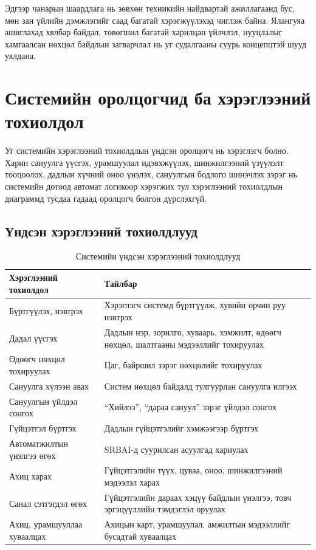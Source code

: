 Эдгээр чанарын шаардлага нь зөвхөн техникийн найдвартай ажиллагаанд бус, мөн зан үйлийн дэмжлэгийг саад багатай хэрэгжүүлэхэд чиглэж байна. Ялангуяа ашиглахад хялбар байдал, төвөгшил багатай харилцан үйлчлэл, нууцлалыг хамгаалсан нөхцөл байдлын загварчлал нь уг судалгааны суурь концепцтэй шууд уялдана.

\section{Системийн оролцогчид ба хэрэглээний тохиолдол}

Уг системийн хэрэглээний тохиолдлын үндсэн оролцогч нь хэрэглэгч болно. Харин сануулга үүсгэх, урамшуулал идэвхжүүлэх, шинжилгээний үзүүлэлт тооцоолох, дадлын хүчний оноо үнэлэх, сануулгын бодлого шинэчлэх зэрэг нь системийн дотоод автомат логикоор хэрэгжих тул хэрэглээний тохиолдлын диаграммд тусдаа гадаад оролцогч болгон дүрслэхгүй.

\subsection{Үндсэн хэрэглээний тохиолдлууд}

\begin{table}[H]
\centering
\small
\setlength{\tabcolsep}{4pt}
\begin{tabular}{|L{5.5cm}|L{7.5cm}|}
\hline
\textbf{Хэрэглээний тохиолдол} & \textbf{Тайлбар} \\
\hline
Бүртгүүлэх, нэвтрэх & Хэрэглэгч системд бүртгүүлж, хувийн орчин руу нэвтрэх \\
\hline
Дадал үүсгэх & Дадлын нэр, зорилго, хуваарь, хэмжилт, өдөөгч нөхцөл, шалтгааны мэдээллийг тохируулах \\
\hline
Өдөөгч нөхцөл тохируулах & Цаг, байршил зэрэг нөхцөлийг тохируулах \\
\hline
Сануулга хүлээн авах & Систем нөхцөл байдалд тулгуурлан сануулга илгээх \\
\hline
Сануулгын үйлдэл сонгох & ``Хийлээ'', ``дараа сануул'' зэрэг үйлдэл сонгох \\
\hline
Гүйцэтгэл бүртгэх & Дадлын гүйцэтгэлийг хэмжээгээр бүртгэх \\
\hline
Автоматжилтын үнэлгээ өгөх & SRBAI-д суурилсан асуулгад хариулах \\
\hline
Ахиц харах & Гүйцэтгэлийн түүх, цуваа, оноо, шинжилгээний мэдээлэл харах \\
\hline
Санал сэтгэгдэл өгөх & Гүйцэтгэлийн дараах хэцүү байдлын үнэлгээ, товч эргэцүүллийн тэмдэглэл оруулах \\
\hline
Ахиц, урамшууллаа хуваалцах & Ахицын карт, урамшуулал, амжилтын мэдээллийг бусадтай хуваалцах \\
\hline
\end{tabular}
\caption{Системийн үндсэн хэрэглээний тохиолдлууд}
\end{table}

